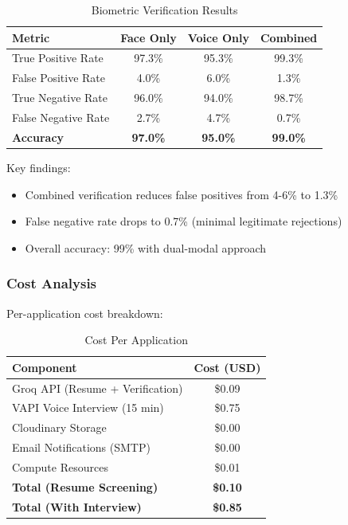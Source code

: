 \documentclass[conference]{IEEEtran}
\begin{document}
\begin{table}[h]
\centering
\caption{Biometric Verification Results}
\label{tab:biometric_results}
\begin{tabular}{@{}lccc@{}}
\toprule
\textbf{Metric} & \textbf{Face Only} & \textbf{Voice Only} & \textbf{Combined} \\ \midrule
True Positive Rate & 97.3\% & 95.3\% & 99.3\% \\
False Positive Rate & 4.0\% & 6.0\% & 1.3\% \\
True Negative Rate & 96.0\% & 94.0\% & 98.7\% \\
False Negative Rate & 2.7\% & 4.7\% & 0.7\% \\ \midrule
\textbf{Accuracy} & \textbf{97.0\%} & \textbf{95.0\%} & \textbf{99.0\%} \\ \bottomrule
\end{tabular}
\end{table}

Key findings:
\begin{itemize}
    \item Combined verification reduces false positives from 4-6\% to 1.3\%
    \item False negative rate drops to 0.7\% (minimal legitimate rejections)
    \item Overall accuracy: 99\% with dual-modal approach
\end{itemize}

\subsubsection{Cost Analysis}

Per-application cost breakdown:

\begin{table}[h]
\centering
\caption{Cost Per Application}
\label{tab:cost_analysis}
\begin{tabular}{@{}lc@{}}
\toprule
\textbf{Component} & \textbf{Cost (USD)} \\ \midrule
Groq API (Resume + Verification) & \$0.09 \\
VAPI Voice Interview (15 min) & \$0.75 \\
Cloudinary Storage & \$0.00 \\
Email Notifications (SMTP) & \$0.00 \\
Compute Resources & \$0.01 \\ \midrule
\textbf{Total (Resume Screening)} & \textbf{\$0.10} \\
\textbf{Total (With Interview)} & \textbf{\$0.85} \\ \bottomrule
\end{tabular}
\end{table}
\end{document}
